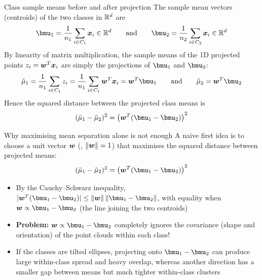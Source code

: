 \documentclass[aspectratio=169]{beamer}\usepackage[]{graphicx}\usepackage[]{xcolor}
\begin{document}
\begin{frame}{Class sample means before and after projection}
    The sample mean vectors (centroids) of the two classes in $\mathbb{R}^d$ are
    \[
        \bmu_1 = \frac{1}{n_1} \sum_{i \in C_1} \bx_i \in \IR^d \qquad \text{and} \qquad
        \bmu_2 = \frac{1}{n_2} \sum_{i \in C_2} \bx_i \in \IR^d
    \]
    \vfill
    By linearity of matrix multiplication, the sample means of the 1D projected points $z_i = \bm{w}^T \bm{x}_i$ are simply the projections of $\bmu_1$ and $\bmu_2$:
    \[
        \tilde{\mu}_1 = \frac{1}{n_1} \sum_{i \in C_1} z_i = \frac{1}{n_1} \sum_{i \in C_1} \bw^T \bx_i = \bw^T \bmu_1 \qquad \text{and} \qquad
        \tilde{\mu}_2 = \bw^T \bmu_2
    \]
    \vfill
    Hence the squared distance between the projected class means is
    \[
        (\tilde{\mu}_1 - \tilde{\mu}_2)^2 = \left(\bw^T(\bmu_1 - \bmu_2)\right)^2
    \]
\end{frame}


\begin{frame}{Why maximising mean separation alone is not enough}
    A naive first idea is to choose a unit vector $\bm{w}$ (\ie, $\|\bm{w}\| = 1$) that maximises the squared distance between projected means:
    \[
        (\tilde{\mu}_1 - \tilde{\mu}_2)^2 = \left(\bw^T(\bmu_1 - \bmu_2)\right)^2
    \]
    \vfill
    \begin{itemize}
        \item By the Cauchy--Schwarz inequality, $|\bw^T(\bmu_1 - \bmu_2)| \le \|\bw\|\,\|\bmu_1 - \bmu_2\|$, with equality when $\bw \propto \bmu_1 - \bmu_2$ (the line joining the two centroids)
        \vfill
        \item \textbf{Problem:} $\bw \propto \bmu_1 - \bmu_2$ completely ignores the covariance (shape and orientation) of the point clouds within each class!
        \vfill
        \item If the classes are tilted ellipses, projecting onto $\bmu_1 - \bmu_2$ can produce large within-class spread and heavy overlap, whereas another direction has a smaller gap between means but much tighter within-class clusters
    \end{itemize}
\end{frame}





\end{document}
